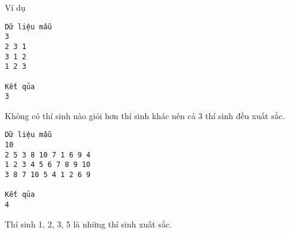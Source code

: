Ví dụ
\begin{verbatim}
Dữ liệu mẫu
3 
2 3 1
3 1 2
1 2 3

Kết qủa
3
\end{verbatim}

   Không có thí sinh nào giỏi hơn thí sinh khác nên cả 3 thí sinh đều xuất sắc.  
\begin{verbatim}
Dữ liệu mẫu
10 
2 5 3 8 10 7 1 6 9 4
1 2 3 4 5 6 7 8 9 10
3 8 7 10 5 4 1 2 6 9

Kết qủa
4
\end{verbatim}

   Thí sinh 1, 2, 3, 5 là những thí sinh xuất sắc.